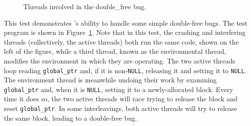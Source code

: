 \begin{figure}
  \hfill
  \caption{Threads involved in the double\_free bug.}
  \label{fig:eval:double_free}
\end{figure}

This test demonstrates {\technique}'s ability to handle some simple
double-free bugs.  The test program is shown in
Figure~\ref{fig:eval:double_free}.  Note that in this test, the
crashing and interfering threads (collectively, the active threads)
both run the same code, shown on the left of the figure, while a third
thread, known as the environmental thread, modifies the environment in
which they are operating.  The two active threads loop reading
\texttt{global\_ptr} and, if it is non-\texttt{NULL}, releasing it and
setting it to \texttt{NULL}.  The environment thread is meanwhile
undoing their work by examining \texttt{global\_ptr} and, when it is
\texttt{NULL}, setting it to a newly-allocated block.  Every time it
does so, the two active threads will race trying to release the block
and reset \texttt{global\_ptr}.  In some interleavings, both active
threads will try to release the same block, leading to a double-free
bug.

